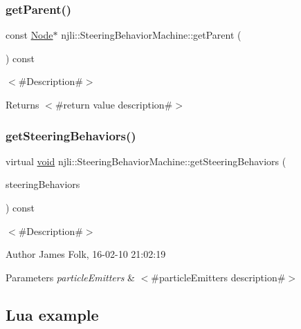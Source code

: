 \subsubsection{\texorpdfstring{get\+Parent()}{getParent()}\hspace{0.1cm}{\footnotesize\ttfamily [2/2]}}
{\footnotesize\ttfamily const \mbox{\hyperlink{classnjli_1_1_node}{Node}}$\ast$ njli\+::\+Steering\+Behavior\+Machine\+::get\+Parent (\begin{DoxyParamCaption}{ }\end{DoxyParamCaption}) const}

$<$\#\+Description\#$>$

\begin{DoxyReturn}{Returns}
$<$\#return value description\#$>$ 
\end{DoxyReturn}
\mbox{\label{classnjli_1_1_steering_behavior_machine_a5f16284442c65dd387dce41393b30c4d}} 
\subsubsection{\texorpdfstring{get\+Steering\+Behaviors()}{getSteeringBehaviors()}}
{\footnotesize\ttfamily virtual \mbox{\hyperlink{_thread_8h_af1e856da2e658414cb2456cb6f7ebc66}{void}} njli\+::\+Steering\+Behavior\+Machine\+::get\+Steering\+Behaviors (\begin{DoxyParamCaption}\item[{std\+::vector$<$ \mbox{\hyperlink{classnjli_1_1_steering_behavior}{Steering\+Behavior}} $\ast$$>$ \&}]{steering\+Behaviors }\end{DoxyParamCaption}) const\hspace{0.3cm}{\ttfamily [virtual]}}



$<$\#\+Description\#$>$ 

\begin{DoxyAuthor}{Author}
James Folk, 16-\/02-\/10 21\+:02\+:19
\end{DoxyAuthor}

\begin{DoxyParams}{Parameters}
{\em particle\+Emitters} & $<$\#particle\+Emitters description\#$>$\\
\hline
\end{DoxyParams}
\hypertarget{classnjli_1_1_steering_behavior_wander_ex1}{}\subsection{Lua example}\label{classnjli_1_1_steering_behavior_wander_ex1}

